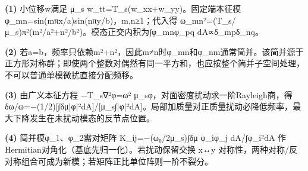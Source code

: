 \par\noindent\textbf{(1)} 小位移w满足 μ\_s w\_tt=T\_s(w\_xx+w\_yy)。固定端本征模 φ\_mn=sin(mπx/a)sin(nπy/b)，m,n≥1；代入得 ω\_mn²=(T\_s/μ\_s)π²(m²/a²+n²/b²)。模态正交内积为∫φ\_mnφ\_pq dA∝δ\_mpδ\_nq。
\par\noindent\textbf{(2)} 若a=b，频率只依赖m²+n²，因此m≠n时φ\_mn和φ\_nm通常简并。该简并源于正方形对称群；即使两个整数对偶然有同一平方和，也应按整个简并子空间处理，不可以普通单模微扰直接分配频移。
\par\noindent\textbf{(3)} 由广义本征方程 −T\_s∇²φ=ω² μ\_sφ，对面密度扰动求一阶Rayleigh商，得 δω/ω=−(1/2)[∫δμ|φ|²dA]/[μ\_s∫|φ|²dA]。局部加质量对正质量扰动必降低频率，最大下降发生在未扰动模态的反节点位置。
\par\noindent\textbf{(4)} 简并模φ\_1、φ\_2需对矩阵 K\_ij=−(ω₀/2μ\_s)∫δμ φ\_iφ\_j dA/∫φ\_i²dA 作Hermitian对角化（基底先归一化）。若扰动保留交换 x↔y 对称性，两种对称/反对称组合可成为新模；若矩阵正比单位阵则一阶不裂分。

